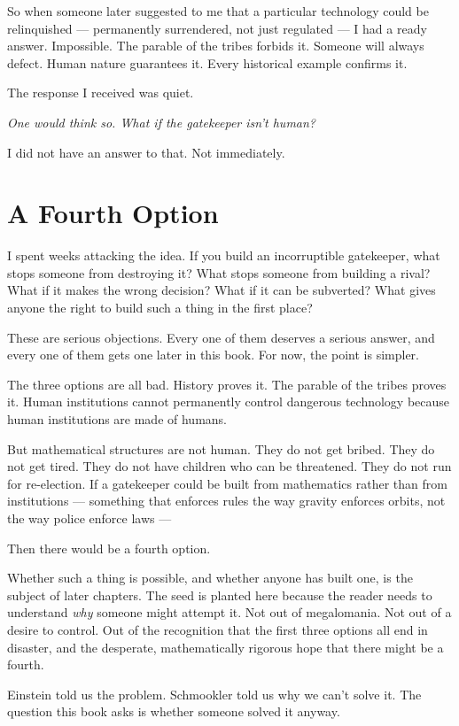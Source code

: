 So when someone later suggested to me that a particular technology could be relinquished --- permanently surrendered, not just regulated --- I had a ready answer. Impossible. The parable of the tribes forbids it. Someone will always defect. Human nature guarantees it. Every historical example confirms it.

The response I received was quiet.

\textit{One would think so. What if the gatekeeper isn't human?}

I did not have an answer to that. Not immediately.

\section*{A Fourth Option}
\label{pos08:a-fourth-option}

I spent weeks attacking the idea. If you build an incorruptible gatekeeper, what stops someone from destroying it? What stops someone from building a rival? What if it makes the wrong decision? What if it can be subverted? What gives anyone the right to build such a thing in the first place?

These are serious objections. Every one of them deserves a serious answer, and every one of them gets one later in this book. For now, the point is simpler.

The three options are all bad. History proves it. The parable of the tribes proves it. Human institutions cannot permanently control dangerous technology because human institutions are made of humans.

But mathematical structures are not human. They do not get bribed. They do not get tired. They do not have children who can be threatened. They do not run for re-election. If a gatekeeper could be built from mathematics rather than from institutions --- something that enforces rules the way gravity enforces orbits, not the way police enforce laws ---

Then there would be a fourth option.

Whether such a thing is possible, and whether anyone has built one, is the subject of later chapters. The seed is planted here because the reader needs to understand \textit{why} someone might attempt it. Not out of megalomania. Not out of a desire to control. Out of the recognition that the first three options all end in disaster, and the desperate, mathematically rigorous hope that there might be a fourth.

Einstein told us the problem.%
{} Schmookler told us why we can't solve it. The question this book asks is whether someone solved it anyway.

\chapterreturn
